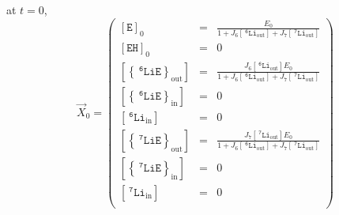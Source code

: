 \documentclass[aps,onecolumn,11pt]{revtex4}
\newcommand{\mychem}[1]{\mathtt{#1}}
\newcommand{\myconc}[1]{\left\lbrack{#1}\right\rbrack}
\newcommand{\spLi}[1]{{~^{\mychem{#1}}\mychem{Li}}}
\newcommand{\spEout}{\mychem{E}}
\newcommand{\Eout}{\myconc{\spEout}}
\newcommand{\spLiEin}[1]{\left\lbrace\spLi{#1}\spEout\right\rbrace_{\mathrm{in}}}
\newcommand{\LiEin}[1]{\myconc{\spLiEin{#1}}}
\newcommand{\spLiEout}[1]{\left\lbrace\spLi{#1}\spEout\right\rbrace_{\mathrm{out}}}
\newcommand{\LiEout}[1]{\myconc{\spLiEout{#1}}}
\newcommand{\spLiIn}[1]{{\spLi{#1}}_{\mathrm{in}}}
\newcommand{\LiIn}[1]{\myconc{\spLiIn{#1}}}
\newcommand{\spLiOut}[1]{{\spLi{#1}}_{\mathrm{out}}}
\newcommand{\LiOut}[1]{\myconc{\spLiOut{#1}}}
\newcommand{\spEHin}{\mychem{EH}}
\newcommand{\EHin}{\myconc{\spEHin}}
\begin{document}
at $t=0$,
\begin{equation}
	\vec{X}_0 = 
	\begin{pmatrix}
	\Eout_0    & = & \frac{E_0}{1+J_6 \LiOut{6} + J_7 \LiOut{7}}  \\
	\EHin_0    & = & 0 \\
	\LiEout{6} & = & \frac{J_6 \LiOut{6} E_0} {1+J_6 \LiOut{6} + J_7 \LiOut{7}} \\
	\LiEin{6}  & = & 0 \\
	\LiIn{6}   & = & 0 \\
	\LiEout{7} & = & \frac{J_7 \LiOut{7} E_0} {1+J_6 \LiOut{6} + J_7 \LiOut{7}}   \\
	\LiEin{7}  & = & 0 \\
	\LiIn{7}   & = & 0 \\
	\end{pmatrix}
\end{equation}
\end{document}
